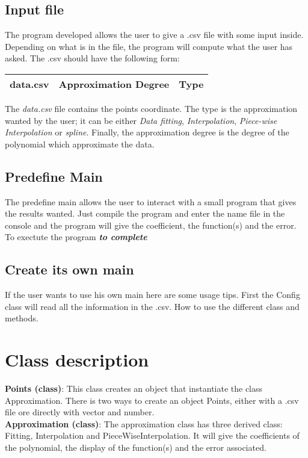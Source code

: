 \documentclass[12pt]{article}
\begin{document}
\subsection{Input file}
The program developed allows the user to give a .csv file with some input inside. Depending on what is in the file, the program will compute what the user has asked. The .csv should have the following form:\\
\begin{center}
\begin{tabular}{|c|c|c|}
\hline
data.csv & Approximation Degree & Type  \\
\hline
\end{tabular} 
\end{center}
The \emph{data.csv} file contains the points coordinate. The type is the approximation wanted by the user; it can be either \emph{Data fitting}, \emph{Interpolation}, \emph{Piece-wise Interpolation} or \emph{spline}. Finally, the approximation degree  is the degree of the polynomial which approximate the data.\\

\subsection{Predefine Main}
The predefine main allows the user to interact with a small program that gives the results wanted. Just compile the program and enter the name file in the console and the program will give the coefficient, the function(s) and the error.
To exectute the program \textbf{\emph{to complete}}

\subsection{Create its own main}
If the user wants to use his own main here are some usage tips. First the Config class will read all the information in the .csv. 
How to use the different class and methods.

\section{Class description}
\textbf{Points (class)}: This class creates an object that instantiate the class Approximation. There is two ways to create an object Points, either with a .csv file ore directly with vector and number.\\
\textbf{Approximation (class)}: The approximation class has three derived class: Fitting, Interpolation and PieceWiseInterpolation. It will give the coefficients of the polynomial, the display of the function(s) and the error associated.
\end{document}
